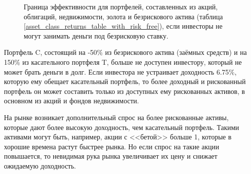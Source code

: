 \begin{figure}[ht]

\caption{Граница эффективности для портфелей, составленных из акций, облигаций,
недвижимости, золота и безрискового актива (таблица 
\ref{asset_class_returns_table_with_risk_free}), если инвесторы не могут 
занимать деньги под безрисковую ставку.}
\label{efficient_frontier_with_risk_free_no_leverage}
\end{figure}

Портфель C, состоящий на -50\% из безрискового актива (заёмных средств) и на 
150\% из касательного портфеля T, больше не доступен инвестору, который не может 
брать деньги в долг. Если инвестора не устраивает доходность 6.75\%, которую ему 
обещает касательный портфель, то более доходный и рискованный портфель он может 
составить только из доступных ему  рискованных активов, в основном из акций и 
фондов недвижимости.

На рынке возникает дополнительный спрос на более рискованные активы, которые 
дают более высокую доходность, чем касательный портфель. Такими активами могут
быть, например, акции с <<бетой>> больше 1, которые в хорошие времена растут
быстрее рынка. Но если спрос на такие акции повышается, то невидимая рука рынка
увеличивает их цену и снижает ожидаемую доходность.

